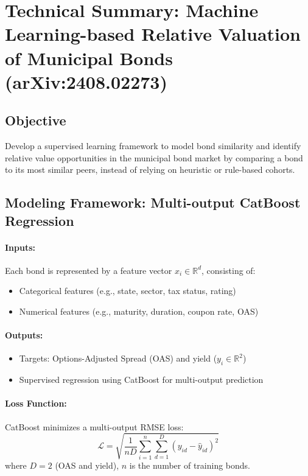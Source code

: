 \documentclass{article}
\begin{document}
\section*{Technical Summary: Machine Learning-based Relative Valuation of Municipal Bonds \\ \small{(arXiv:2408.02273)}}

\subsection*{Objective}
Develop a supervised learning framework to model bond similarity and identify relative value opportunities in the municipal bond market by comparing a bond to its most similar peers, instead of relying on heuristic or rule-based cohorts.

\subsection*{Modeling Framework: Multi-output CatBoost Regression}

\paragraph{Inputs:}
Each bond is represented by a feature vector \( x_i \in \mathbb{R}^d \), consisting of:
\begin{itemize}[nosep]
    \item Categorical features (e.g., state, sector, tax status, rating)
    \item Numerical features (e.g., maturity, duration, coupon rate, OAS)
\end{itemize}

\paragraph{Outputs:}
\begin{itemize}[nosep]
    \item Targets: Options-Adjusted Spread (OAS) and yield (\( y_i \in \mathbb{R}^2 \))
    \item Supervised regression using CatBoost for multi-output prediction
\end{itemize}

\paragraph{Loss Function:}
CatBoost minimizes a multi-output RMSE loss:
\[
\mathcal{L} = \sqrt{\frac{1}{nD} \sum_{i=1}^n \sum_{d=1}^D (y_{id} - \hat{y}_{id})^2}
\]
where \( D=2 \) (OAS and yield), \( n \) is the number of training bonds.
\end{document}
